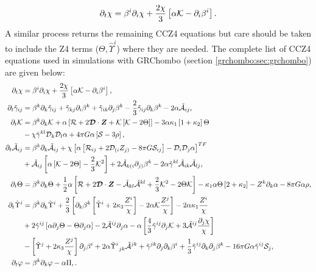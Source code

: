 \begin{equation}
\partial_t \chi =  \beta^i \partial_i \chi + \frac{2\chi}{3} \left[\alpha \mathcal{K} - \partial_i \beta^i \right].
\end{equation}
A similar process returns the remaining CCZ4 equations but care should be taken to include the Z4 terms ($\Theta,\hat{\Upsilon}^i$) where they are needed. The complete list of CCZ4 equations used in simulations with {\sc GRChombo} (section \ref{grchombo:sec:grchombo}) are given below:
\begin{align} \partial_t \chi &=  \beta^i \partial_i \chi + \frac{2\chi}{3} \left[\alpha \mathcal{K} - \partial_i \beta^i \right],\\
\partial_t\tilde{\gamma}_{ij} &=  \beta^k\partial_k\tilde{\gamma}_{ij}  + \tilde{\gamma}_{kj}\partial_i \beta^k + \tilde{\gamma}_{ik}\partial_j\beta^k - \frac{2}{3}\tilde{\gamma}_{ij} \partial_k \beta^k - 2\alpha\tilde{\mathcal{A}}_{ij},\\
\partial_t\mathcal{K} &=  \beta^k\partial_k\mathcal{K} + \alpha\left[ \mathcal{R} + 2\boldsymbol{\mathcal{D}}\cdot \boldsymbol{Z} + \mathcal{K}\left[ \mathcal{K}-2\Theta\right]\right] - 3\alpha \kappa_1\left[ 1+\kappa_2\right]\Theta \nonumber\\
&-\chi\tilde{\gamma}^{kl}\mathcal{D}_k\mathcal{D}_l\alpha + 4\pi G\alpha\left[ \mathcal{S} - 3\rho\right], \\
\partial_t\tilde{\mathcal{A}}_{ij} &=  \beta^k \partial_k \tilde{\mathcal{A}}_{ij}+\chi\left[\alpha\left[\mathcal{R}_{ij} + 2\mathcal{D}_{(i}Z_{j)}-8\pi G \mathcal{S}_{ij} \right] -\mathcal{D}_i\mathcal{D}_j\alpha \right]^{TF}\nonumber\\
& +\tilde{\mathcal{A}}_{ij}\left[ \alpha\left[ \mathcal{K}-2\Theta\right]-\frac{2}{3}\mathcal{K}^2\right] + 2\tilde{\mathcal{A}}_{k(i}\partial_{j)}\beta^k -2\alpha\tilde{\gamma}^{kl}\tilde{\mathcal{A}}_{ik}\tilde{\mathcal{A}}_{lj},\\
\partial_t\Theta &= \beta^k\partial_k \Theta + \frac{1}{2}\alpha\left[ \mathcal{R} + 2\boldsymbol{\mathcal{D}}\cdot \boldsymbol{Z} - \tilde{\mathcal{A}}_{kl} \tilde{\mathcal{A}}^{kl} + \frac{2}{3}\mathcal{K}^2 - 2\Theta\mathcal{K}\right] -\kappa_1\alpha\Theta\left[ 2+\kappa_2\right] - Z^k\partial_k\alpha - 8\pi G \alpha \rho, \\
\partial_t\hat{\Upsilon}^i &=  \beta^k \partial_k \hat{\Upsilon}^i + \frac{2}{3}\left[ \partial_k \beta^k \left[ \tilde{\Upsilon}^i+2\kappa_3 \frac{Z^{i}}{\chi}\right]-2\alpha\mathcal{K}\frac{Z^j}{\chi}\right]-2\alpha\kappa_1\frac{Z^i}{\chi}\nonumber \\
& + 2\tilde{\gamma}^{ij}\left[ \alpha\partial_j\Theta -\Theta \partial_j\alpha \right] -2\tilde{\mathcal{A}}^{ij}\partial_j\alpha - \alpha\left[ \frac{4}{3}\tilde{\gamma}^{ij}\partial_j\mathcal{K} + 3\tilde{\mathcal{A}}^{ij}\frac{\partial_j \chi}{\chi}\right]\nonumber\\
& -\left[ \tilde{\Upsilon}^j + 2\kappa_3 \frac{Z^j}{\chi}\right]\partial_j \beta^i + 2\alpha \tilde{\Upsilon}^i_{\,\,\,jk}\tilde{\mathcal{A}}^{jk} + \tilde{\gamma}^{jk}\partial_j\partial_k \beta^i + \frac{1}{3} \tilde{\gamma}^{ij}\partial_k \partial_j \beta^k - 16\pi G \alpha \tilde{\gamma}^{ij}\mathcal{S}_j, \\
\partial_t \varphi &= \beta^k\partial_k \varphi - \alpha\Pi ,\label{nr:eq:ccz4kg1}.\end{align}
